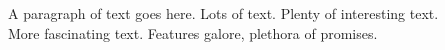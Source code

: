A paragraph of text goes here.  Lots of text.  Plenty of interesting
text.~\cite{han2017frappuccino} \\

More fascinating text. Features galore, plethora of promises.\\
